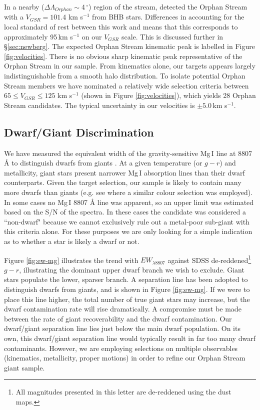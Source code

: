 \documentclass[10pt,apjl]{emulateapj}
\begin{document}
In a nearby ($\Delta\Lambda_{Orphan} \sim 4\,^\circ$) region of the stream, \citet{Newberg_et-al_2010} detected the Orphan Stream with a $V_{GSR} = 101.4$ km s$^{-1}$ from BHB stars. Differences in accounting for the local standard of rest between this work and \citet{Newberg_et-al_2010} means that this corresponds to approximately 95\,km s$^{-1}$ on our $V_{GSR}$ scale.  This is discussed further in \S\ref{sec:newberg}. The expected Orphan Stream kinematic peak is labelled in Figure \ref{fig:velocities}. There is no obvious sharp kinematic peak representative of the Orphan Stream in our sample. From kinematics alone, our targets appears largely indistinguishable from a smooth halo distribution. To isolate potential Orphan Stream members we have nominated a relatively wide selection criteria between $65 \leq V_{GSR} \leq 125$ km s$^{-1}$ (shown in Figure \ref{fig:velocities}), which yields 28 Orphan Stream candidates. The typical uncertainty in our velocities is $\pm{}5.0$\,km s$^{-1}$.

\subsection{Dwarf/Giant Discrimination}
\label{sec:dwarf-giant}

We have measured the equivalent width of the gravity-sensitive Mg\,\textsc{I} line at 8807 \AA{} to distinguish dwarfs from giants \citep{Battaglia_Starkenburg_2012}. At a given temperature (or $g - r$) and metallicity, giant stars present narrower Mg\,\textsc{I} absorption lines than their dwarf counterparts. Given the target selection, our sample is likely to contain many more dwarfs than giants (e.g. see \citet{Casey_et-al_2012} where a similar colour selection was employed). In some cases no Mg\,\textsc{I} 8807 \AA{} line was apparent, so an upper limit was estimated based on the S/N of the spectra. In these cases the candidate was considered a ``non-dwarf" because we cannot exclusively rule out a metal-poor sub-giant with this criteria alone. For these purposes we are only looking for a simple indication as to whether a star is likely a dwarf or not. 

Figure \ref{fig:ew-mg} illustrates the trend with $EW_{\lambda8807}$ against SDSS de-reddened\footnote{All magnitudes presented in this letter are de-reddened using the \citet{Schlegel_Finkbeiner_Davis_1998} dust maps.} $g - r$, illustrating the dominant upper dwarf branch we wish to exclude. Giant stars populate the lower, sparser branch. A separation line has been adopted to distinguish dwarfs from giants, and is shown in Figure \ref{fig:ew-mg}. If we were to place this line higher, the total number of true giant stars may increase, but the dwarf contamination rate will rise dramatically. A compromise must be made between the rate of giant recoverability and the dwarf contamination. Our  dwarf/giant separation line lies just below the main dwarf population. On its own, this dwarf/giant separation line would typically result in far too many dwarf contaminants. However, we are  employing selections on multiple observables (kinematics, metallicity, proper motions) in order to refine our Orphan Stream giant sample. 
\end{document}
